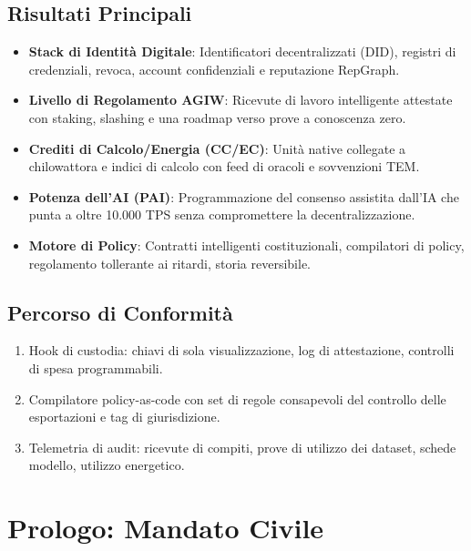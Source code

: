\documentclass[11pt]{article}
\begin{document}
\subsection{Risultati Principali}
\begin{itemize}[noitemsep]
  \item \textbf{Stack di Identità Digitale}: Identificatori decentralizzati (DID), registri di credenziali, revoca, account confidenziali e reputazione RepGraph.
  \item \textbf{Livello di Regolamento AGIW}: Ricevute di lavoro intelligente attestate con staking, slashing e una roadmap verso prove a conoscenza zero.
  \item \textbf{Crediti di Calcolo/Energia (CC/EC)}: Unità native collegate a chilowattora e indici di calcolo con feed di oracoli e sovvenzioni TEM.
  \item \textbf{Potenza dell'AI (PAI)}: Programmazione del consenso assistita dall'IA che punta a oltre 10.000 TPS senza compromettere la decentralizzazione.
  \item \textbf{Motore di Policy}: Contratti intelligenti costituzionali, compilatori di policy, regolamento tollerante ai ritardi, storia reversibile.
\end{itemize}

\subsection{Percorso di Conformità}
\begin{enumerate}[noitemsep]
  \item Hook di custodia: chiavi di sola visualizzazione, log di attestazione, controlli di spesa programmabili.
  \item Compilatore policy-as-code con set di regole consapevoli del controllo delle esportazioni e tag di giurisdizione.
  \item Telemetria di audit: ricevute di compiti, prove di utilizzo dei dataset, schede modello, utilizzo energetico.
\end{enumerate}

\section{Prologo: Mandato Civile}
\end{document}
